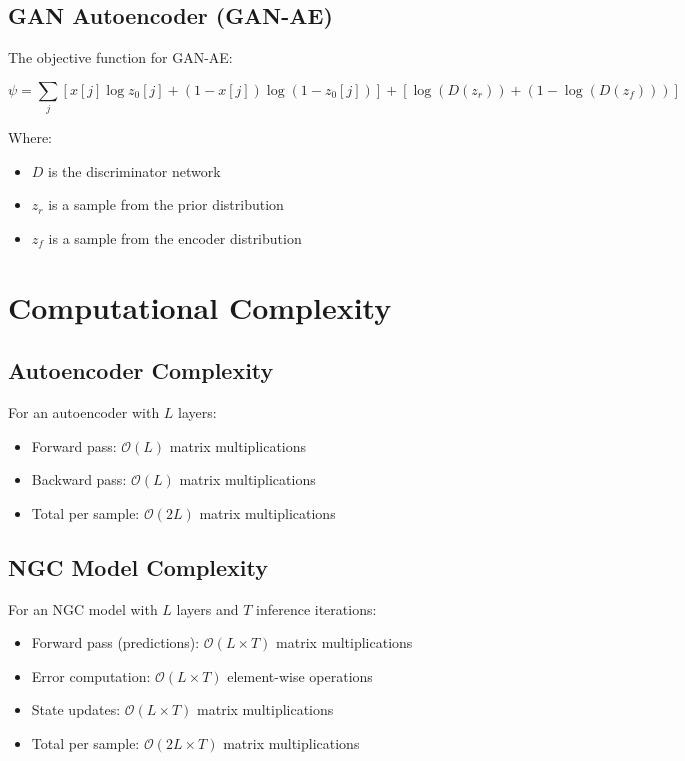 \documentclass{article}
\begin{document}
\subsection{GAN Autoencoder (GAN-AE)}

The objective function for GAN-AE:

\begin{equation}
  \psi = \sum_j [x[j] \log z_0[j] + (1-x[j]) \log(1-z_0[j])] + [\log(D(z_r)) + (1-\log(D(z_f)))]
\end{equation}

Where:
\begin{itemize}
  \item $D$ is the discriminator network
  \item $z_r$ is a sample from the prior distribution
  \item $z_f$ is a sample from the encoder distribution
\end{itemize}

\section{Computational Complexity}

\subsection{Autoencoder Complexity}

For an autoencoder with $L$ layers:
\begin{itemize}
  \item Forward pass: $\mathcal{O}(L)$ matrix multiplications
  \item Backward pass: $\mathcal{O}(L)$ matrix multiplications
  \item Total per sample: $\mathcal{O}(2L)$ matrix multiplications
\end{itemize}

\subsection{NGC Model Complexity}

For an NGC model with $L$ layers and $T$ inference iterations:
\begin{itemize}
  \item Forward pass (predictions): $\mathcal{O}(L \times T)$ matrix multiplications
  \item Error computation: $\mathcal{O}(L \times T)$ element-wise operations
  \item State updates: $\mathcal{O}(L \times T)$ matrix multiplications
  \item Total per sample: $\mathcal{O}(2L \times T)$ matrix multiplications
\end{itemize}
\end{document}
